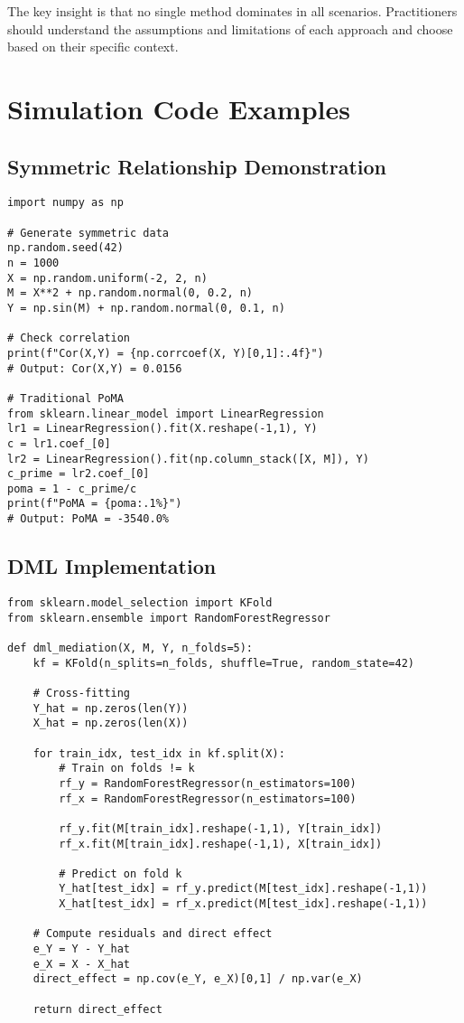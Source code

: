 \documentclass[11pt,a4paper]{article}
\begin{document}
The key insight is that no single method dominates in all scenarios. Practitioners should understand the assumptions and limitations of each approach and choose based on their specific context.




\appendix

\section{Simulation Code Examples}

\subsection{Symmetric Relationship Demonstration}
\begin{verbatim}
import numpy as np

# Generate symmetric data
np.random.seed(42)
n = 1000
X = np.random.uniform(-2, 2, n)
M = X**2 + np.random.normal(0, 0.2, n)
Y = np.sin(M) + np.random.normal(0, 0.1, n)

# Check correlation
print(f"Cor(X,Y) = {np.corrcoef(X, Y)[0,1]:.4f}")
# Output: Cor(X,Y) = 0.0156

# Traditional PoMA
from sklearn.linear_model import LinearRegression
lr1 = LinearRegression().fit(X.reshape(-1,1), Y)
c = lr1.coef_[0]
lr2 = LinearRegression().fit(np.column_stack([X, M]), Y)
c_prime = lr2.coef_[0]
poma = 1 - c_prime/c
print(f"PoMA = {poma:.1%}")
# Output: PoMA = -3540.0%
\end{verbatim}

\subsection{DML Implementation}
\begin{verbatim}
from sklearn.model_selection import KFold
from sklearn.ensemble import RandomForestRegressor

def dml_mediation(X, M, Y, n_folds=5):
    kf = KFold(n_splits=n_folds, shuffle=True, random_state=42)
    
    # Cross-fitting
    Y_hat = np.zeros(len(Y))
    X_hat = np.zeros(len(X))
    
    for train_idx, test_idx in kf.split(X):
        # Train on folds != k
        rf_y = RandomForestRegressor(n_estimators=100)
        rf_x = RandomForestRegressor(n_estimators=100)
        
        rf_y.fit(M[train_idx].reshape(-1,1), Y[train_idx])
        rf_x.fit(M[train_idx].reshape(-1,1), X[train_idx])
        
        # Predict on fold k
        Y_hat[test_idx] = rf_y.predict(M[test_idx].reshape(-1,1))
        X_hat[test_idx] = rf_x.predict(M[test_idx].reshape(-1,1))
    
    # Compute residuals and direct effect
    e_Y = Y - Y_hat
    e_X = X - X_hat
    direct_effect = np.cov(e_Y, e_X)[0,1] / np.var(e_X)
    
    return direct_effect
\end{verbatim}
\end{document}
